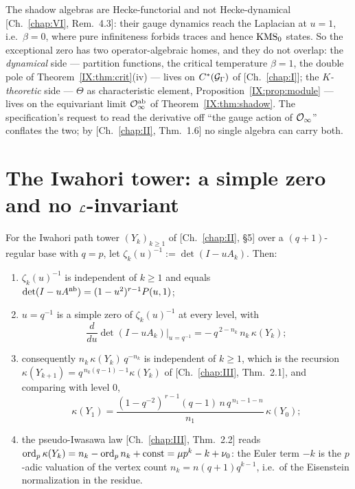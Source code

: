 \begin{remark}\label{IX:rem:twoalgebras}
The shadow algebras are Hecke-functorial and not Hecke-dynamical [Ch.~\ref{chap:VI}, Rem.~4.3]: their
gauge dynamics reach the Laplacian at $u=1$, i.e.\ $\beta=0$, where pure infiniteness
forbids traces and hence $\mathrm{KMS}_0$ states. So the exceptional zero has two
operator-algebraic homes, and they do not overlap: the \emph{dynamical} side ---
partition functions, the critical temperature $\beta=1$, the double pole of
Theorem~\ref{IX:thm:crit}(iv) --- lives on $C^*(\mathcal{G}_\Gamma)$ of [Ch.~\ref{chap:I}]; the
\emph{$K$-theoretic} side --- $\Theta$ as characteristic element,
Proposition~\ref{IX:prop:module} --- lives on the equivariant limit
$\mathcal{O}_\infty^{\mathrm{ab}}$ of Theorem~\ref{IX:thm:shadow}. The specification's request to
read the derivative off ``the gauge action of $\mathcal{O}_\infty$'' conflates the two; by [Ch.~\ref{chap:II}, Thm.~1.6] no single algebra can carry both.
\end{remark}

\section{\texorpdfstring{The Iwahori tower: a simple zero and no $\mathcal{L}$-invariant}{The Iwahori tower: a simple zero and no L-invariant}}\label{IX:sec:iwahori}

\begin{theorem}\label{IX:thm:iwahori}
For the Iwahori path tower $(Y_k)_{k\ge1}$ of {\rm[Ch.~\ref{chap:II}, \S5]} over a $(q{+}1)$-regular
base with $q=p$, let $\zeta_k(u)^{-1}:=\det(I-uA_k)$. Then:
\begin{enumerate}
\item[(i)] $\zeta_k(u)^{-1}$ is independent of $k\ge1$ and equals
$\det(I-uA^{\mathrm{nb}})=(1-u^{2})^{r-1}P(u,1)$;
\item[(ii)] $u=q^{-1}$ is a simple zero of $\zeta_k(u)^{-1}$ at every level, with
\[
\frac{d}{du}\det(I-uA_k)\Big|_{u=q^{-1}}=-\,q^{\,2-n_k}\,n_k\,\kappa(Y_k);
\]
\item[(iii)] consequently $n_k\,\kappa(Y_k)\,q^{-n_k}$ is independent of $k\ge1$, which is
the recursion $\kappa(Y_{k+1})=q^{\,n_k(q-1)-1}\kappa(Y_k)$ of {\rm[Ch.~\ref{chap:III}, Thm.~2.1]}, and
comparing with level $0$,
\[
\kappa(Y_1)=\frac{(1-q^{-2})^{\,r-1}(q-1)\,n\,q^{\,n_1-1-n}}{n_1}\,\kappa(Y_0);
\]
\item[(iv)] the pseudo-Iwasawa law {\rm[Ch.~\ref{chap:III}, Thm.~2.2]} reads
$\operatorname{ord}_p\kappa(Y_k)=n_k-\operatorname{ord}_p n_k+\mathrm{const}=\mu p^{k}-k+\nu_0$: the Euler term $-k$
is the $p$-adic valuation of the vertex count $n_k=n(q{+}1)q^{k-1}$, i.e.\ of the
Eisenstein normalization in the residue.
\end{enumerate}
\end{theorem}

